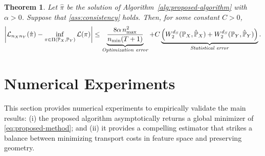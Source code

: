\documentclass{article}
\newtheorem{theorem}{Theorem}
\newtheorem{corollary}{Corollary}
\newtheorem{assumption}{Assumption}
\begin{document}
\begin{theorem}
	\label{thm:consistency}
	Let $\hat{\pi}$ be the solution of Algorithm~\ref{alg:proposed-algorithm} with $\alpha > 0$. Suppose that \cref{ass:consistency} holds.
	Then, for some constant $C > 0$,
	\begin{align*}
		\left\vert \mathcal{L}_{n_Xn_Y}(\hat{\pi}) - \inf_{\pi \in \Pi(\mathbb{P}_X,\mathbb{P}_Y)} \mathcal{L}(\pi) \right\vert \leq \underbrace{\frac{8\alpha \, n_{\max}^2}{n_{\min}(T+1)}}_{\text{\emph{Optimization error}}} + C\underbrace{\left(W_2^{d_S}(\mathbb{P}_X,\hat{\mathbb{P}}_X) + W_2^{d_S}(\mathbb{P}_Y,\hat{\mathbb{P}}_Y) \right)}_{\text{\emph{Statistical error}}} .
	\end{align*}
\end{theorem}

%

\section{Numerical Experiments}\label{sec:Experiments}
This section provides numerical experiments to empirically validate the main results: (i) the proposed algorithm asymptotically returns a global minimizer of \eqref{eq:proposed-method}; and (ii) it provides a compelling estimator that strikes a balance between minimizing transport costs in feature space and preserving geometry.
\end{document}
